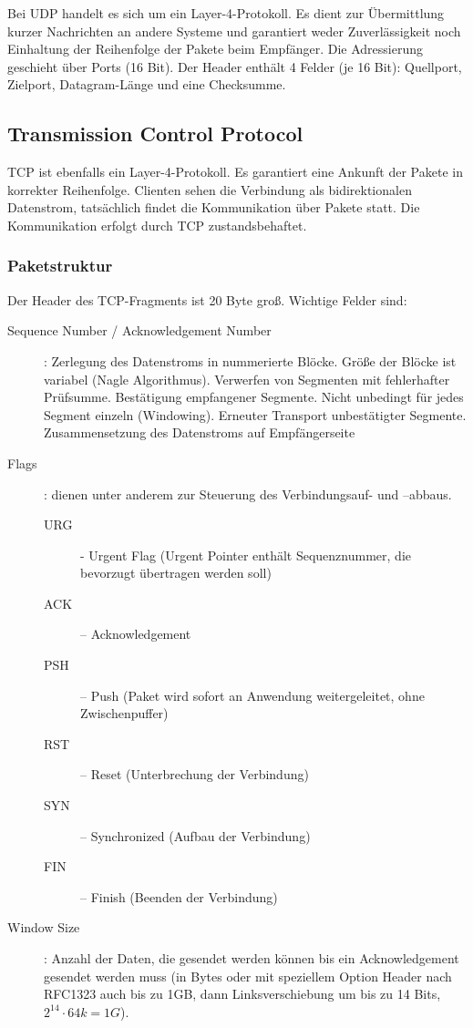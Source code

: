 \documentclass{article} %
\begin{document}
Bei UDP handelt es sich um ein Layer-4-Protokoll.\cite{rfc768}
Es dient zur Übermittlung kurzer Nachrichten an andere Systeme und garantiert weder Zuverlässigkeit noch Einhaltung der Reihenfolge der Pakete beim Empfänger.
Die Adressierung geschieht über Ports (16 Bit).
Der Header enthält 4 Felder (je 16 Bit): Quellport, Zielport, Datagram-Länge und eine Checksumme.

\subsection{Transmission Control Protocol}

TCP ist ebenfalls ein Layer-4-Protokoll.\cite{rfc793}
Es garantiert eine Ankunft der Pakete in korrekter Reihenfolge.
Clienten sehen die Verbindung als bidirektionalen Datenstrom, tatsächlich findet die Kommunikation über Pakete statt. Die Kommunikation erfolgt durch TCP zustandsbehaftet.

\subsubsection{Paketstruktur}

Der Header des TCP-Fragments ist 20 Byte groß.
Wichtige Felder sind:
\begin{description}
	\item [Sequence Number / Acknowledgement Number]: Zerlegung des Datenstroms in nummerierte Blöcke.
	Größe der Blöcke ist variabel (Nagle Algorithmus).
	Verwerfen von Segmenten mit fehlerhafter Prüfsumme.
	Bestätigung empfangener Segmente.
	Nicht unbedingt für jedes Segment einzeln (Windowing).
	Erneuter Transport unbestätigter Segmente.
	Zusammensetzung des Datenstroms auf Empfängerseite
	
	\item [Flags]: dienen unter anderem zur Steuerung des Verbindungsauf- und –abbaus.
	\begin{description}
		\item [URG] - Urgent Flag (Urgent Pointer enthält
			Sequenznummer, die bevorzugt übertragen werden soll)
		\item [ACK] – Acknowledgement
		\item [PSH] – Push (Paket wird sofort an Anwendung weitergeleitet, ohne Zwischenpuffer)
		\item [RST] – Reset (Unterbrechung der Verbindung)
		\item [SYN] – Synchronized (Aufbau der Verbindung)
		\item [FIN] – Finish (Beenden der Verbindung)
	\end{description}
	\item [Window Size]: Anzahl der Daten, die gesendet werden können bis ein Acknowledgement gesendet werden muss (in Bytes oder mit speziellem Option Header nach RFC1323 \cite{rfc1323} auch bis zu 1GB,	dann Linksverschiebung um bis zu 14 Bits, $2^{14} \cdot 64k = 1G$).
\end{description}
\end{document}
